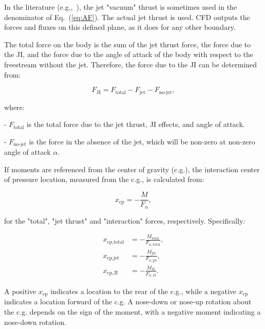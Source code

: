 \documentclass[12pt]{article}
\begin{document}
In the literature (e.g.,~\cite{cassel2003applying}), the jet "vacuum" thrust is sometimes used in the denominator of Eq.~(\ref{eq:AF}). The actual jet thrust is used. CFD outputs the forces and fluxes on this defined plane, as it does for any other boundary.

The total force on the body is the sum of the jet thrust force, the force due to the JI, and the force due to the angle of attack of the body with respect to the freestream without the jet. Therefore, the force due to the JI can be determined from:

\begin{equation}
    F_{\text{JI}} = F_{\text{total}} - F_{\text{jet}} - F_{\text{no-jet}},
    \label{eq:F_JI}
\end{equation}

where:

- $ F_{\text{total}} $ is the total force due to the jet thrust, JI effects, and angle of attack.
    
- $ F_{\text{no-jet}} $ is the force in the absence of the jet, which will be non-zero at non-zero angle of attack $ \alpha $.


If moments are referenced from the center of gravity (c.g.), the interaction center of pressure location, measured from the c.g., is calculated from:

\begin{equation}
    x_{\text{cp}} = -\frac{M}{F_n},
    \label{eq:xcp}
\end{equation}

for the "total", "jet thrust" and "interaction" forces, respectively. Specifically:

\begin{align}
    x_{\text{cp,total}} &= -\frac{M_{\text{total}}}{F_{n,\text{total}}}, \\
    x_{\text{cp,jet}} &= -\frac{M_{\text{jet}}}{F_{n,\text{jet}}}, \\
    x_{\text{cp,JI}} &= -\frac{M_{\text{JI}}}{F_{n,\text{JI}}}.
\end{align}

A positive $x_{\text{cp}}$ indicates a location to the rear of the c.g., while a negative $x_{\text{cp}}$ indicates a location forward of the c.g. A nose-down or nose-up rotation about the c.g. depends on the sign of the moment, with a negative moment indicating a nose-down rotation.
\end{document}
